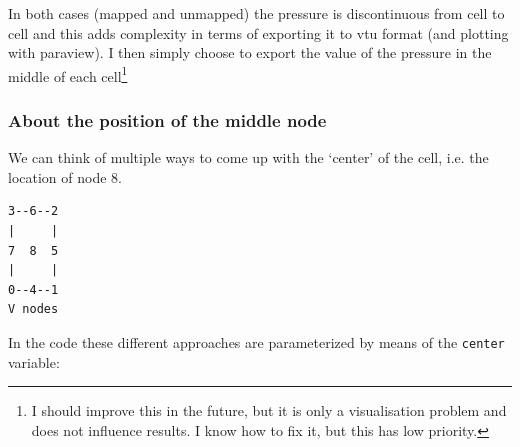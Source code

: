 In both cases (mapped and unmapped) the pressure is discontinuous from cell to cell 
and this adds complexity in terms of exporting it to vtu format (and plotting with paraview). 
I then simply choose to export the value of the pressure in the middle of 
each cell\footnote{I should improve this in the future, but it is 
only a visualisation problem and does not influence results.
I know how to fix it, but this has low priority.}

\subsubsection{About the position of the middle node}

We can think of multiple ways to come up with the `center' of the cell, 
i.e. the location of node 8.

\begin{verbatim}
3--6--2 
|     | 
7  8  5 
|     | 
0--4--1 
V nodes 
\end{verbatim}

In the code these different approaches are parameterized by means of the
\lstinline{center} variable:

